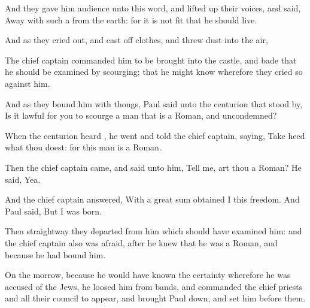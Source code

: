 {And they
gave
him
audience
unto
this
word,
and
{} lifted
up
their
voices, and
said, Away
with such
a
{}
from the
earth:
for it
is
not
fit that
he should
live.

And as
they cried
out,
and cast
off
{}
clothes,
and
threw
dust
into the
air,

The chief
captain
commanded
him to be
brought
into the
castle, and bade
that
he should be
examined by
scourging;
that he might
know
wherefore they
cried
so against
him.

And
as they
bound
him with
thongs,
Paul
said
unto the
centurion
that stood
by, Is it
lawful for
you to
scourge a
man that is a
Roman,
and
uncondemned?

When the
centurion
heard
{}, he
went and
told the chief
captain,
saying, Take
heed
what thou
doest:
for
this
man
is a
Roman.

Then the chief
captain
came, and
said unto
him,
Tell
me,
art
thou a
Roman? He
said,
Yea.

And the chief
captain
answered, With a
great
sum
obtained
I
this
freedom.
And
Paul
said,
But
I
was
{}
born.

Then
straightway they
departed
from
him
which
should have
examined
him:
and the chief
captain
also was
afraid, after he
knew
that he
was a
Roman,
and
because he
had
bound
him.

On the
morrow,
because he
would have
known the
certainty
wherefore he was
accused
of the
Jews, he
loosed
him
from
{}
bands,
and
commanded the chief
priests
and
all
their
council to
appear,
and
brought
Paul
down, and set
him
before
them.




\par }
